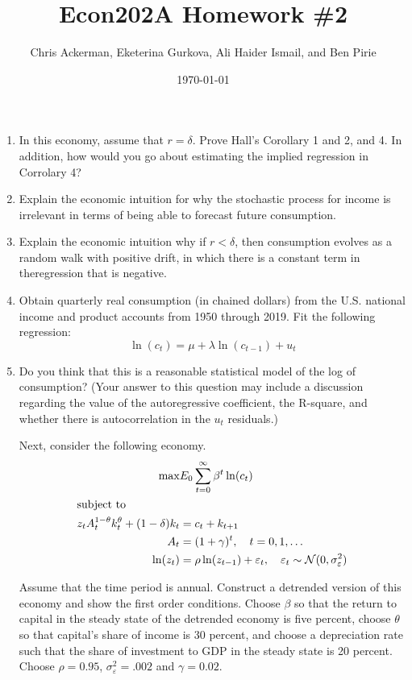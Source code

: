 \documentclass[11pt]{article}
\author{Chris Ackerman, Eketerina Gurkova, Ali Haider Ismail, and Ben Pirie}
\date{\today}
\title{Econ202A Homework \#2}
\begin{document}
\maketitle
\newpage

\begin{enumerate}
\item In this economy, assume that $r = \delta$. Prove Hall’s Corollary 1 and 2, and 4. In addition, how would you go about estimating the implied regression in Corrolary 4?

\newpage
\item Explain the economic intuition for why the stochastic process for income is irrelevant in terms of being able to forecast future consumption. 

\newpage
\item Explain the economic intuition why if $r < \delta$, then consumption evolves as a random walk with positive drift, in which there is a constant term in theregression that is negative. 

\newpage
\item  Obtain quarterly real consumption (in chained dollars) from the U.S.
national income and product accounts from 1950 through 2019. Fit the following
regression:
\[
\ln(c_t) = \mu + \lambda \ln(c_{t-1}) + u_t
\]

\newpage
\item  Do you think that this is a reasonable statistical model of the log of
consumption? (Your answer to this question may include a discussion regarding
the value of the autoregressive coefficient, the R-square, and whether there is
autocorrelation in the $u_t$ residuals.)

\newpage
Next, consider the following economy.
\begin{align*}
\max & E_0 \sum^\infty_{t = 0}\beta^t \ln (c_t)\\
\intertext{subject to}
z_t A_t^{1 - \theta} k_t^\theta + (1 - \delta)k_t &= c_t + k_{t + 1}\\
A_t &= (1 + \gamma)^t, \quad t = 0, 1, \ldots \\
\ln(z_t) &= \rho \ln (z_{t - 1}) + \varepsilon_t,\quad \varepsilon_t \sim \mathcal{N}(0, \sigma^2_\varepsilon)
\end{align*}

Assume that the time period is annual. Construct a detrended version of
this economy and show the first order conditions. Choose $\beta$ so that the return
to capital in the steady state of the detrended economy is five percent, choose
$\theta$ so that capital’s share of income is 30 percent, and choose a depreciation rate
such that the share of investment to GDP in the steady state is 20 percent.
Choose $\rho = 0.95$, $\sigma^2_\varepsilon
 = .002$ and $\gamma = 0.02$.


\end{enumerate}
\end{document}
